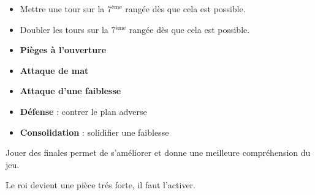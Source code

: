 \begin{itemize}[leftmargin=1.7cm, label=, itemsep=0pt]%
\item  Mettre une tour sur la 7$^\text{ème}$ rangée dès que cela est possible.
\item  Doubler les tours sur la 7$^\text{ème}$ rangée dès que cela est possible.
\end{itemize}



\begin{itemize}[leftmargin=2.7cm, label=, itemsep=0pt]%
\item  {\bf Pièges à l'ouverture}
\item  {\bf Attaque de mat}
\item  {\bf Attaque d'une faiblesse}
\end{itemize}

\begin{itemize}[leftmargin=2.7cm, label=, itemsep=0pt]%
\item  {\bf Défense} : contrer le plan adverse
\item  {\bf Consolidation} : solidifier une faiblesse
\end{itemize}


Jouer des finales permet de s'améliorer et donne une meilleure compréhension du jeu.

Le roi devient une pièce trés forte, il faut l'activer.

